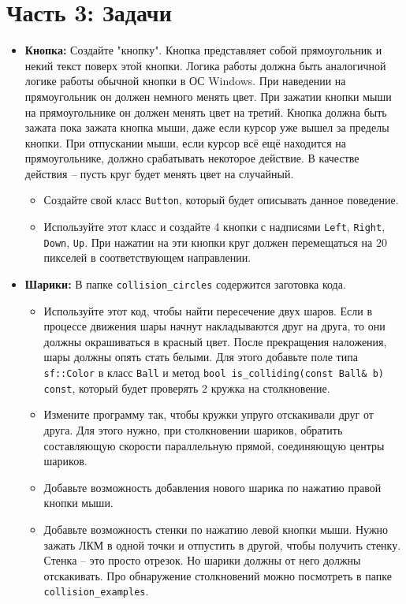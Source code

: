 \documentclass{article}
\begin{document}
\newpage
\section*{Часть 3: Задачи}
\begin{itemize}
\item \textbf{Кнопка:} Создайте "кнопку". Кнопка представляет собой прямоугольник и некий текст поверх этой кнопки. Логика работы должна быть аналогичной логике работы обычной кнопки в ОС Windows. При наведении на прямоугольник он должен немного менять цвет. При зажатии кнопки мыши на прямоугольнике он должен менять цвет на третий. Кнопка должна быть зажата пока зажата кнопка мыши, даже если курсор уже вышел за пределы кнопки. При отпускании мыши, если курсор всё ещё находится на прямоугольнике, должно срабатывать некоторое действие. В качестве действия -- пусть круг будет менять цвет на случайный.

\begin{itemize}
\item Создайте свой класс \texttt{Button}, который будет описывать данное поведение.
\item Используйте этот класс и создайте 4 кнопки с надписями \texttt{Left}, \texttt{Right}, \texttt{Down}, \texttt{Up}. При нажатии на эти кнопки круг должен перемещаться на 20 пикселей в соответствующем направлении. 
\end{itemize}

\item \textbf{Шарики:} В папке \texttt{collision\_circles} содержится заготовка кода. 
\begin{itemize}
\item Используйте этот код, чтобы найти пересечение двух шаров. Если в процессе движения шары начнут накладываются друг на друга, то они должны окрашиваться в красный цвет. После прекращения наложения, шары должны опять стать белыми. Для этого добавьте поле типа \texttt{sf::Color} в класс \texttt{Ball} и метод \texttt{bool is\_colliding(const Ball\& b) const}, который будет проверять 2 кружка на столкновение.
\item Измените программу так, чтобы кружки упруго отскакивали друг от друга. Для этого нужно, при столкновении шариков, обратить составляющую скорости параллельную прямой, соединяющую центры шариков.
\item Добавьте возможность добавления нового шарика по нажатию правой кнопки мыши.
\item Добавьте возможность стенки по нажатию левой кнопки мыши. Нужно зажать ЛКМ в одной точки и отпустить в другой, чтобы получить стенку. Стенка -- это просто отрезок. Но шарики должны от него должны отскакивать. Про обнаружение столкновений можно посмотреть в папке \texttt{collision\_examples}.
\end{itemize}




\end{itemize}
\end{document}
